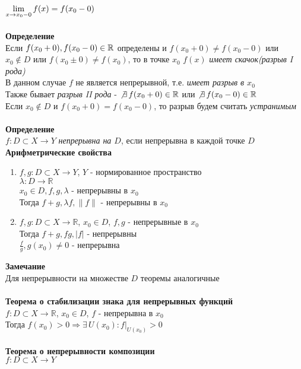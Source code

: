 \documentclass[12pt]{article}
\begin{document}
$\lim\limits_{x\rightarrow x_0-0} f(x) = f(x_0-0)$\\\\
\textbf{Определение}\\
Если $f(x_0+0), f(x_0-0) \in \mathbb{R}$ определены и $f(x_0+0) \neq f(x_0-0)$ или $x_0 \not\in D$ или $f(x_0\pm0) \neq f(x_0)$, то в точке $x_0$ $f(x)$ \textit{имеет скачок(разрыв I рода)}\\
В данном случае $f$ не является непрерывной, т.е. \textit{имеет разрыв в $x_0$}\\
Также бывает \textit{разрыв II рода} - $\not\exists\,f(x_0+0) \in \mathbb{R}$ или $\not\exists\,f(x_0-0) \in \mathbb{R}$\\
Если $x_0 \notin D$ и $f(x_0+0) = f(x_0-0)$, то разрыв будем считать \textit{устранимым}\\\\
\textbf{Определение}\\
$f:D\subset X \rightarrow Y$ \textit{непрерывна на $D$}, если непрерывна в каждой точке $D$\\
\textbf{Арифметрические свойства}
\begin{enumerate}
    \item $f,g: D\subset X \rightarrow Y$, $Y$ - нормированное пространство\\
    $\lambda:D \rightarrow \mathbb{R}$\\
    $x_0\in D, f,g,\lambda$ - непрерывны в $x_0$\\
    Тогда $f+g,\lambda f, \|f\|$ - непрерывны в $x_0$
    \item $f,g: D\subset X \rightarrow \mathbb{R}$, $x_0\in D$, $f,g$ - непрерывные в $x_0$\\
    Тогда $f+g, fg, |f|$ - непрерывны\\
    $\frac{f}{g}, g(x_0) \neq 0$ - непрерывна\\ 
\end{enumerate}
\textbf{Замечание}\\
Для непрерывности на множестве $D$ теоремы аналогичные\\\\
\textbf{Теорема о стабилизации знака для непрерывных функций}\\
$f:D\subset X \rightarrow \mathbb{R}$, $x_0 \in D$, $f$ - непрерывна в $x_0$\\
Тогда $f(x_0) > 0 \Rightarrow \exists\,U(x_0): f|_{U(x_0)} > 0$\\\\
\textbf{Теорема о непрерывности композиции}\\
$f:D\subset X \rightarrow Y$\\
\end{document}
